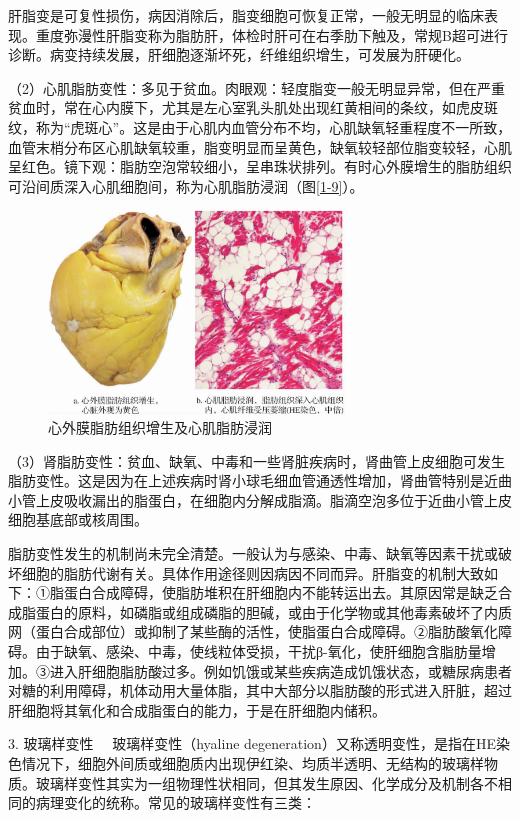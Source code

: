 肝脂变是可复性损伤，病因消除后，脂变细胞可恢复正常，一般无明显的临床表现。重度弥漫性肝脂变称为脂肪肝，体检时肝可在右季肋下触及，常规B超可进行诊断。病变持续发展，肝细胞逐渐坏死，纤维组织增生，可发展为肝硬化。

（2）心肌脂肪变性：多见于贫血。肉眼观：轻度脂变一般无明显异常，但在严重贫血时，常在心内膜下，尤其是左心室乳头肌处出现红黄相间的条纹，如虎皮斑纹，称为“虎斑心”。这是由于心肌内血管分布不均，心肌缺氧轻重程度不一所致，血管末梢分布区心肌缺氧较重，脂变明显而呈黄色，缺氧较轻部位脂变较轻，心肌呈红色。镜下观：脂肪空泡常较细小，呈串珠状排列。有时心外膜增生的脂肪组织可沿间质深入心肌细胞间，称为心肌脂肪浸润（图\ref{1-9}）。
\begin{figure}[!htbp]
	\centering
    \includegraphics[width=0.7\textwidth]{./images/Image00010.jpg}
	\caption{心外膜脂肪组织增生及心肌脂肪浸润}
	\label{fig1-9} 
	\end{figure} 

（3）肾脂肪变性：贫血、缺氧、中毒和一些肾脏疾病时，肾曲管上皮细胞可发生脂肪变性。这是因为在上述疾病时肾小球毛细血管通透性增加，肾曲管特别是近曲小管上皮吸收漏出的脂蛋白，在细胞内分解成脂滴。脂滴空泡多位于近曲小管上皮细胞基底部或核周围。

脂肪变性发生的机制尚未完全清楚。一般认为与感染、中毒、缺氧等因素干扰或破坏细胞的脂肪代谢有关。具体作用途径则因病因不同而异。肝脂变的机制大致如下：①脂蛋白合成障碍，使脂肪堆积在肝细胞内不能转运出去。其原因常是缺乏合成脂蛋白的原料，如磷脂或组成磷脂的胆碱，或由于化学物或其他毒素破坏了内质网（蛋白合成部位）或抑制了某些酶的活性，使脂蛋白合成障碍。②脂肪酸氧化障碍。由于缺氧、感染、中毒，使线粒体受损，干扰β-氧化，使肝细胞含脂肪量增加。③进入肝细胞脂肪酸过多。例如饥饿或某些疾病造成饥饿状态，或糖尿病患者对糖的利用障碍，机体动用大量体脂，其中大部分以脂肪酸的形式进入肝脏，超过肝细胞将其氧化和合成脂蛋白的能力，于是在肝细胞内储积。

{3. 玻璃样变性} 　玻璃样变性（hyaline
degeneration）又称透明变性，是指在HE染色情况下，细胞外间质或细胞质内出现伊红染、均质半透明、无结构的玻璃样物质。玻璃样变性其实为一组物理性状相同，但其发生原因、化学成分及机制各不相同的病理变化的统称。常见的玻璃样变性有三类：

